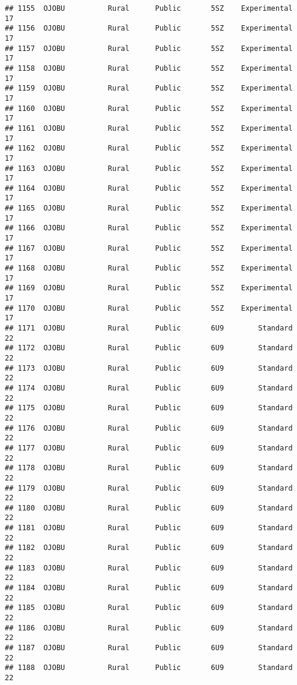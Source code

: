 \documentclass[
]{article}
\begin{document}
\begin{verbatim}
## 1155  OJOBU          Rural      Public       5SZ    Experimental        17
## 1156  OJOBU          Rural      Public       5SZ    Experimental        17
## 1157  OJOBU          Rural      Public       5SZ    Experimental        17
## 1158  OJOBU          Rural      Public       5SZ    Experimental        17
## 1159  OJOBU          Rural      Public       5SZ    Experimental        17
## 1160  OJOBU          Rural      Public       5SZ    Experimental        17
## 1161  OJOBU          Rural      Public       5SZ    Experimental        17
## 1162  OJOBU          Rural      Public       5SZ    Experimental        17
## 1163  OJOBU          Rural      Public       5SZ    Experimental        17
## 1164  OJOBU          Rural      Public       5SZ    Experimental        17
## 1165  OJOBU          Rural      Public       5SZ    Experimental        17
## 1166  OJOBU          Rural      Public       5SZ    Experimental        17
## 1167  OJOBU          Rural      Public       5SZ    Experimental        17
## 1168  OJOBU          Rural      Public       5SZ    Experimental        17
## 1169  OJOBU          Rural      Public       5SZ    Experimental        17
## 1170  OJOBU          Rural      Public       5SZ    Experimental        17
## 1171  OJOBU          Rural      Public       6U9        Standard        22
## 1172  OJOBU          Rural      Public       6U9        Standard        22
## 1173  OJOBU          Rural      Public       6U9        Standard        22
## 1174  OJOBU          Rural      Public       6U9        Standard        22
## 1175  OJOBU          Rural      Public       6U9        Standard        22
## 1176  OJOBU          Rural      Public       6U9        Standard        22
## 1177  OJOBU          Rural      Public       6U9        Standard        22
## 1178  OJOBU          Rural      Public       6U9        Standard        22
## 1179  OJOBU          Rural      Public       6U9        Standard        22
## 1180  OJOBU          Rural      Public       6U9        Standard        22
## 1181  OJOBU          Rural      Public       6U9        Standard        22
## 1182  OJOBU          Rural      Public       6U9        Standard        22
## 1183  OJOBU          Rural      Public       6U9        Standard        22
## 1184  OJOBU          Rural      Public       6U9        Standard        22
## 1185  OJOBU          Rural      Public       6U9        Standard        22
## 1186  OJOBU          Rural      Public       6U9        Standard        22
## 1187  OJOBU          Rural      Public       6U9        Standard        22
## 1188  OJOBU          Rural      Public       6U9        Standard        22

\end{verbatim}
\end{document}
